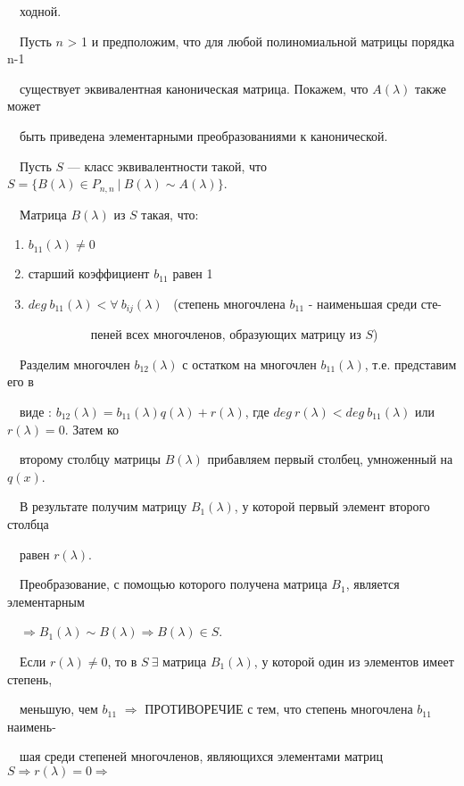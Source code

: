 \documentclass[a4paper, 12pt]{report}
\begin{document}
	$\quad$ходной.
	\par\bigskip
	$\quad$Пусть $n$ > 1 и предположим, что для любой полиномиальной матрицы порядка n-1 
	
	$\quad$существует эквивалентная каноническая матрица. Покажем, что $A(\lambda)$ также может 
	
	$\quad$быть приведена элементарными преобразованиями к канонической.
	\par\bigskip
	$\quad$Пусть $S$ --- класс эквивалентности такой, что $S = \{B(\lambda) \in P_{n,n} \ |\  B(\lambda) \sim A(\lambda)\}$.
	\par\bigskip
	$\quad$Матрица $B(\lambda)$ из $S$ такая, что:
	\begin{enumerate}
		\setlength{\itemindent}{5em}
		\item  $b_{11}(\lambda) \not= 0$
		\item старший коэффициент $b_{11}$ равен 1
		\item $deg\ b_{11}(\lambda) < \forall\ b_{ij}(\lambda)$ \ (степень многочлена $b_{11}$ - наименьшая среди сте-
		
		$\quad \quad \quad \quad \quad$пеней всех многочленов, образующих матрицу из $S$)
	\end{enumerate}
	
	$\quad$Разделим многочлен $b_{12}(\lambda)$ с остатком на многочлен $b_{11}(\lambda)$, т.е. представим его в
	
	$\quad$виде : $b_{12}(\lambda) = b_{11}(\lambda)q(\lambda) + r(\lambda)$, где $deg\ r(\lambda) < deg\ b_{11}(\lambda)$ или $r(\lambda) = 0$. Затем ко
	
	$\quad$второму столбцу матрицы $B(\lambda)$ прибавляем первый столбец, умноженный на $q(x)$. 
	
	$\quad$В результате получим матрицу $B_1(\lambda)$, у которой первый элемент второго столбца
	
	$\quad$равен $r(\lambda)$.
	\par\bigskip
	$\quad$Преобразование, с помощью которого получена матрица $B_1$, является элементарным
	
	$\quad\Rightarrow B_1(\lambda) \sim B(\lambda) \Rightarrow B(\lambda) \in S$.
	\par\bigskip
	$\quad$Если $r(\lambda) \not= 0$, то в $S\ \exists$ матрица $B_1(\lambda)$, у которой один из элементов имеет степень,
	
	$\quad$меньшую, чем $b_{11}$ $\Rightarrow$ ПРОТИВОРЕЧИЕ с тем, что степень многочлена $b_{11}$ наимень-
	
	$\quad$шая среди степеней многочленов, являющихся элементами матриц $S \Rightarrow r(\lambda) = 0 \Rightarrow$
	
\end{document}
